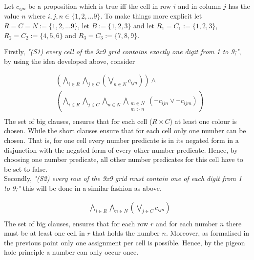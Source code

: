 \documentclass[11pt,a4paper]{article}
\begin{document}
Let $c_{ijn}$ be a proposition which is true iff the cell in row $i$ and in column $j$ has the value $n$ where $i,j,n \in \{1,2,\dots 9\}$. To make things more explicit let $R=C=N:=\{1, 2, \dots 9\}$, let $B:=\{1,2,3\}$ and let $R_1=C_1:=\{1,2,3\}$, $R_2=C_2:=\{4,5,6\}$ and $R_3=C_3:=\{7,8,9\}$.

Firstly, \emph{"(S1) every cell of the 9x9 grid contains exactly one digit from 1 to 9;"}, by using the idea developed above, consider

\begin{equation*}
\begin{split}
&(\bigwedge_{i \in R}  \bigwedge_{j \in C} (\bigvee_{n \in N} c_{ijn}))  \land \\
&(\bigwedge_{i \in R}  \bigwedge_{j \in C} \bigwedge_{n \in N} \bigwedge_{\substack{m \in N \\ m>n}}(\neg c_{ijn} \lor \neg c_{ijm}))  \\
\end{split}
\end{equation*}
The set of big clauses, ensures that for each cell ($R \times C$) at least one colour is chosen. While the short clauses ensure that for each cell only one number can be chosen. That is, for one cell every number predicate is in its negated form in a disjunction with the negated form of every other number predicate. Hence, by choosing one number predicate, all other number predicates for this cell have to be set to false. \\
  

Secondly, \emph{"(S2) every row of the 9x9 grid must contain one of each digit from 1 to 9;"} this will be done in a similar fashion as above.

\begin{equation*}
\begin{split}
&\bigwedge_{i \in R}  \bigwedge_{n \in N} (\bigvee_{j \in C} c_{ijn}) \\
\end{split}
\end{equation*}
The set of big clauses, ensures that for each row $r$ and for each number $n$ there must be at least one cell in $r$ that holds the number $n$. Moreover, as formalised in the previous point only one assignment per cell is possible. Hence, by the pigeon hole principle a number can only occur once.\\
\end{document}
